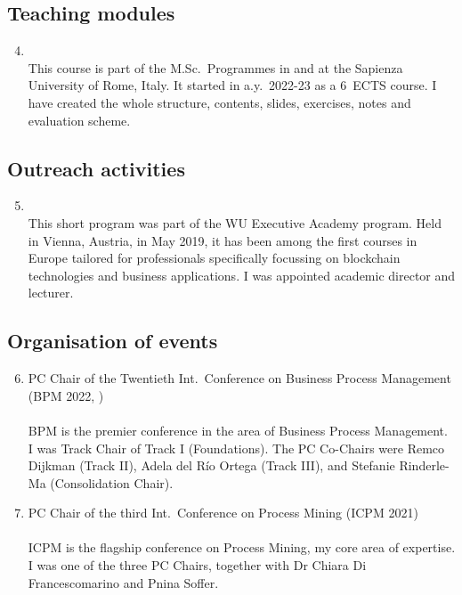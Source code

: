 \subsection*{Teaching modules}
\begin{enumerate}\setcounter{enumi}{3}
	\item {} %
	\\[2ex]
	This course is part of the M.Sc.\ Programmes in  and  at the Sapienza University of Rome, Italy. It started in a.y.\ 2022-23 as a 6~ECTS course. I have created the whole structure, contents, slides, exercises, notes and evaluation scheme.
\end{enumerate}
%
\subsection*{Outreach activities}
\begin{enumerate}\setcounter{enumi}{4}
	\item {} 
	\\[2ex]
	This short program was part of the WU Executive Academy program. Held in Vienna, Austria, in May 2019, it has been among the first courses in Europe tailored for professionals specifically focussing on blockchain technologies and business applications. I was appointed academic director and lecturer.
\end{enumerate}
%
\subsection*{Organisation of events}
\begin{enumerate}\setcounter{enumi}{5}
	\item PC Chair of the Twentieth Int.\ Conference on Business Process Management (BPM 2022, )
	\\ %
	\\[2ex]
	BPM is the premier conference in the area of Business Process Management. I was Track Chair of Track I (Foundations). The PC Co-Chairs were Remco Dijkman (Track II), Adela del R\'io Ortega (Track III), and Stefanie Rinderle-Ma (Consolidation Chair).
	\item PC Chair of the third Int.\ Conference on Process Mining (ICPM 2021) 
	\\ %
	\\[2ex]
	ICPM is the flagship conference on Process Mining, my core area of expertise. I was one of the three PC Chairs, together with Dr Chiara Di Francescomarino and Pnina Soffer.
\end{enumerate}
